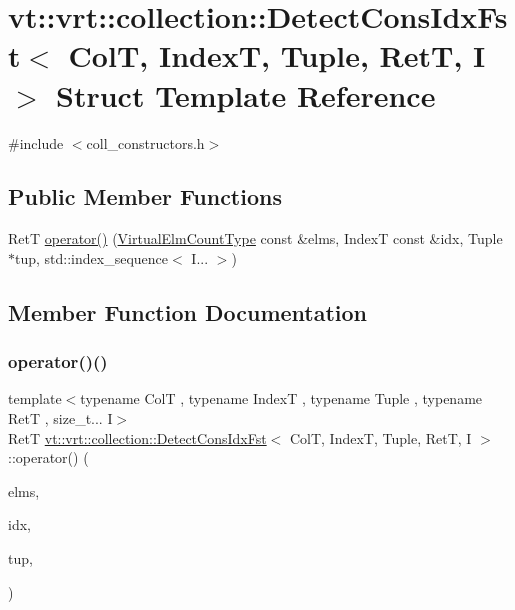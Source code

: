 \hypertarget{structvt_1_1vrt_1_1collection_1_1_detect_cons_idx_fst}{}\section{vt\+:\+:vrt\+:\+:collection\+:\+:Detect\+Cons\+Idx\+Fst$<$ ColT, IndexT, Tuple, RetT, I $>$ Struct Template Reference}
\label{structvt_1_1vrt_1_1collection_1_1_detect_cons_idx_fst}


{\ttfamily \#include $<$coll\+\_\+constructors.\+h$>$}

\subsection*{Public Member Functions}
\begin{DoxyCompactItemize}
\item 
RetT \hyperlink{structvt_1_1vrt_1_1collection_1_1_detect_cons_idx_fst_ad50fc6b078486e287445e460c2fa26e8}{operator()} (\hyperlink{namespacevt_ac115668758184050beff7a9281a2c490}{Virtual\+Elm\+Count\+Type} const \&elms, IndexT const \&idx, Tuple $\ast$tup, std\+::index\+\_\+sequence$<$ I... $>$)
\end{DoxyCompactItemize}


\subsection{Member Function Documentation}
\mbox{\label{structvt_1_1vrt_1_1collection_1_1_detect_cons_idx_fst_ad50fc6b078486e287445e460c2fa26e8}} 
\subsubsection{\texorpdfstring{operator()()}{operator()()}}
{\footnotesize\ttfamily template$<$typename ColT , typename IndexT , typename Tuple , typename RetT , size\+\_\+t... I$>$ \\
RetT \hyperlink{structvt_1_1vrt_1_1collection_1_1_detect_cons_idx_fst}{vt\+::vrt\+::collection\+::\+Detect\+Cons\+Idx\+Fst}$<$ ColT, IndexT, Tuple, RetT, I $>$\+::operator() (\begin{DoxyParamCaption}\item[{\hyperlink{namespacevt_ac115668758184050beff7a9281a2c490}{Virtual\+Elm\+Count\+Type} const \&}]{elms,  }\item[{IndexT const \&}]{idx,  }\item[{Tuple $\ast$}]{tup,  }\item[{std\+::index\+\_\+sequence$<$ I... $>$}]{ }\end{DoxyParamCaption})\hspace{0.3cm}{\ttfamily [inline]}}



